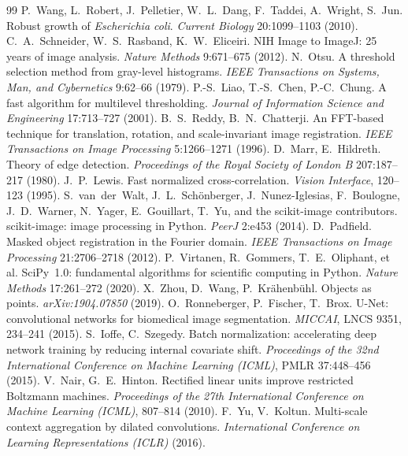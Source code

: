 \documentclass[11pt,a4paper]{article}
\begin{document}
\begin{thebibliography}{99}
 P.~Wang, L.~Robert, J.~Pelletier, W.~L.~Dang, F.~Taddei, A.~Wright, S.~Jun. Robust growth of \emph{Escherichia coli}. \emph{Current Biology} 20:1099--1103 (2010).
 C.~A.~Schneider, W.~S.~Rasband, K.~W.~Eliceiri. NIH Image to ImageJ: 25 years of image analysis. \emph{Nature Methods} 9:671--675 (2012).
 N.~Otsu. A threshold selection method from gray-level histograms. \emph{IEEE Transactions on Systems, Man, and Cybernetics} 9:62--66 (1979).
 P.-S.~Liao, T.-S.~Chen, P.-C.~Chung. A fast algorithm for multilevel thresholding. \emph{Journal of Information Science and Engineering} 17:713--727 (2001).
 B.~S.~Reddy, B.~N.~Chatterji. An FFT-based technique for translation, rotation, and scale-invariant image registration. \emph{IEEE Transactions on Image Processing} 5:1266--1271 (1996).
 D.~Marr, E.~Hildreth. Theory of edge detection. \emph{Proceedings of the Royal Society of London B} 207:187--217 (1980).
 J.~P.~Lewis. Fast normalized cross-correlation. \emph{Vision Interface}, 120--123 (1995).
 S.~van~der~Walt, J.~L.~Sch\"onberger, J.~Nunez-Iglesias, F.~Boulogne, J.~D.~Warner, N.~Yager, E.~Gouillart, T.~Yu, and the scikit-image contributors. scikit-image: image processing in Python. \emph{PeerJ} 2:e453 (2014).
 D.~Padfield. Masked object registration in the Fourier domain. \emph{IEEE Transactions on Image Processing} 21:2706--2718 (2012).
 P.~Virtanen, R.~Gommers, T.~E.~Oliphant, et al. SciPy~1.0: fundamental algorithms for scientific computing in Python. \emph{Nature Methods} 17:261--272 (2020).
 X.~Zhou, D.~Wang, P.~Kr\"ahenb\"uhl. Objects as points. \emph{arXiv:1904.07850} (2019).
 O.~Ronneberger, P.~Fischer, T.~Brox. U-Net: convolutional networks for biomedical image segmentation. \emph{MICCAI}, LNCS 9351, 234--241 (2015).
 S.~Ioffe, C.~Szegedy. Batch normalization: accelerating deep network training by reducing internal covariate shift. \emph{Proceedings of the 32nd International Conference on Machine Learning (ICML)}, PMLR 37:448--456 (2015).
 V.~Nair, G.~E.~Hinton. Rectified linear units improve restricted Boltzmann machines. \emph{Proceedings of the 27th International Conference on Machine Learning (ICML)}, 807--814 (2010).
 F.~Yu, V.~Koltun. Multi-scale context aggregation by dilated convolutions. \emph{International Conference on Learning Representations (ICLR)} (2016).

\end{thebibliography}
\end{document}
